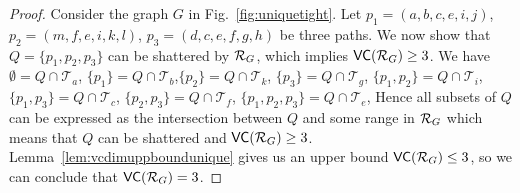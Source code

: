 \begin{proof}
  Consider the graph $G$ in Fig.~\ref{fig:uniquetight}.
  Let $p_1=(a,b,c,e,i,j)$, $p_2=(m,f,e,i,k,l)$, $p_3=(d,c,e,f,g,h)$ be three
  paths. We now show that $Q=\{p_1,p_2,p_3\}$ can be shattered by $\mathcal{R}_G$, which
  implies $\mathsf{VC}(\mathcal{R}_G)\ge 3$. We have $\emptyset=Q\cap\mathcal{T}_a$,
  $\{p_1\}=Q\cap\mathcal{T}_b$,$\{p_2\}=Q\cap\mathcal{T}_k$,
  $\{p_3\}=Q\cap\mathcal{T}_g$, $\{p_1,p_2\}=Q\cap\mathcal{T}_i$,
  $\{p_1,p_3\}=Q\cap\mathcal{T}_c$, $\{p_2,p_3\}=Q\cap\mathcal{T}_f$,
  $\{p_1,p_2,p_3\}=Q\cap\mathcal{T}_e$,  
  Hence all subsets of $Q$ can be expressed as the intersection between $Q$ and
  some range in $\mathcal{R}_G$ which means that $Q$ can be shattered and
  $\mathsf{VC}(\mathcal{R}_G)\ge 3$. Lemma~\ref{lem:vcdimuppboundunique} gives us an upper
  bound $\mathsf{VC}(\mathcal{R}_G)\le3$, so we can conclude that $\mathsf{VC}(\mathcal{R}_G)=3$.
\end{proof}
\fi

